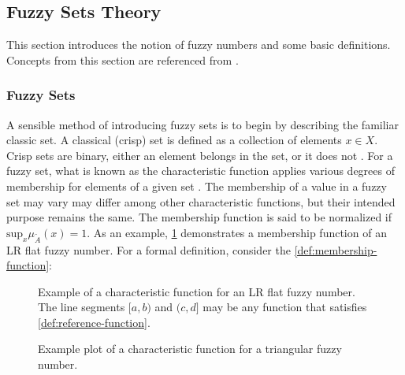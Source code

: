 \documentclass[ee,msthesis]{usuthesis}
\begin{document}
\subsection{Fuzzy Sets Theory}
\label{sec:fuzzy-sets-theory}
This section introduces the notion of fuzzy numbers and some basic definitions. Concepts from this section are
referenced from
\cite{zimmermann-2001-fuzzy-set,das-2016-mathem-model,yaghobi-2014-compar-fuzzy,bello-2019-fuzzy-activ}.

\subsubsection{Fuzzy Sets}
\label{sec:org700fc33}
A sensible method of introducing fuzzy sets is to begin by describing the familiar classic set. A classical (crisp) set
is defined as a collection of elements \(x \in X\). Crisp sets are binary, either an element belongs in the set, or it does
not \cite{zimmermann-2001-fuzzy-set}. For a fuzzy set, what is known as the characteristic function applies various
degrees of membership for elements of a given set \cite{zimmermann-2001-fuzzy-set}. The membership of a value in a
fuzzy set may vary may differ among other characteristic functions, but their intended purpose remains the same. The
membership function is said to be normalized if \(\text{sup}_x \mu_{\tilde{A}}(x) = 1\). As an example,
\ref{fig:lr-fuzzy-characteristic} demonstrates a membership function of an LR flat fuzzy number. For a formal definition, consider
the \ref{def:membership-function}:

\begin{subfigures}
    \begin{figure}[htpb]
    \centering
        
        \caption{Example of a characteristic function for an LR flat fuzzy number. The line segments $[a,b)$ and $(c,d]$
          may be any function that satisfies \ref{def:reference-function}.}
        \label{fig:lr-fuzzy-characteristic}
    \end{figure}
    \hfill

    \begin{figure}[htpb]
    \centering
        
        \caption{Example plot of a characteristic function for a triangular fuzzy number.}
        \label{fig:triang-characteristic}
    \end{figure}
\end{subfigures}
\end{document}

